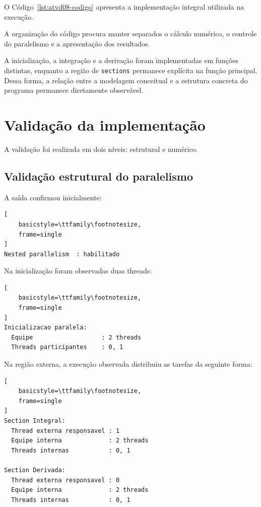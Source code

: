 O Código~\ref{lst:atvd08-codigo} apresenta a implementação integral utilizada
na execução.



A organização do código procura manter separados o cálculo numérico, o
controle do paralelismo e a apresentação dos resultados.

A inicialização, a integração e a derivação foram implementadas em funções
distintas, enquanto a região de \texttt{sections} permanece explícita na
função principal. Dessa forma, a relação entre a modelagem conceitual e a
estrutura concreta do programa permanece diretamente observável.


\section{Validação da implementação}
\label{sec:atvd08-validacao}

A validação foi realizada em dois níveis: estrutural e numérico.


\subsection{Validação estrutural do paralelismo}

A saída confirmou inicialmente:

\begin{lstlisting}[
    basicstyle=\ttfamily\footnotesize,
    frame=single
]
Nested parallelism  : habilitado
\end{lstlisting}

Na inicialização foram observadas duas threads:

\begin{lstlisting}[
    basicstyle=\ttfamily\footnotesize,
    frame=single
]
Inicializacao paralela:
  Equipe                   : 2 threads
  Threads participantes    : 0, 1
\end{lstlisting}

Na região externa, a execução observada distribuiu as tarefas da seguinte
forma:

\begin{lstlisting}[
    basicstyle=\ttfamily\footnotesize,
    frame=single
]
Section Integral:
  Thread externa responsavel : 1
  Equipe interna             : 2 threads
  Threads internas           : 0, 1

Section Derivada:
  Thread externa responsavel : 0
  Equipe interna             : 2 threads
  Threads internas           : 0, 1
\end{lstlisting}


